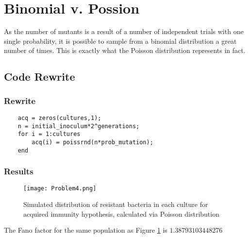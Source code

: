 \documentclass[titlepage]{scrreprt}
\begin{document}
\section{Binomial v. Possion}
As the number of mutants is a result of a number of independent trials with one single probability, it is possible to sample from a binomial distribution a great number of times.  This is exactly what the Poisson distribution represents in fact.
\subsection{Code Rewrite}
\subsubsection{Rewrite}
\begin{verbatim}
    acq = zeros(cultures,1);
    n = initial_inoculum*2^generations;
    for i = 1:cultures
        acq(i) = poissrnd(n*prob_mutation);
    end
\end{verbatim}
\subsubsection{Results}
\begin{figure}[H]
    \centering
    \texttt{[image: Problem4.png]}
    \caption{Simulated distribution of resistant bacteria in each culture for acquired immunity hypothesis, calculated via Poisson distribution}
    \label{fig:problem4_histogram}
\end{figure}
The Fano factor for the same population as Figure \ref{fig:problem4_histogram} is $1.38793103448276$
\end{document}
